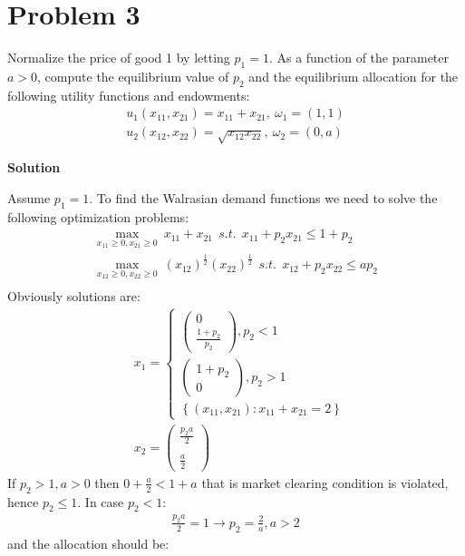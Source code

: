 \documentclass[a4paper]{article}
\begin{document}
\section*{Problem 3}
Normalize the price of good 1 by letting $p_1 = 1$. As a function of the parameter $a > 0$,
compute the equilibrium value of $p_2$ and the equilibrium allocation for the following utility
functions and endowments:
\begin{align*}
u_1(x_{11}, x_{21}) = x_{11} + x_{21},\ \omega_1 = (1, 1)\\
u_2(x_{12}, x_{22}) = \sqrt{x_{12} x_{22}},\ \omega_2 = (0, a)
\end{align*}


\textbf{Solution}


Assume $p_1 = 1$. To find the Walrasian demand functions we need to solve the following optimization problems:
\begin{align*}
\underset{x_{11} \ge 0, x_{21}\ge 0}{\max}\ x_{11} + x_{21}\ \ s.t.\ \ x_{11} + p_2x_{21} \le 1 + p_2\\
\underset{x_{12} \ge 0, x_{22} \ge 0}{\max}\ (x_{12})^{\frac{1}{2}}(x_{22})^{\frac{1}{2}}\ \ s.t.\ \ x_{12} + p_2x_{22} \le ap_2\\
\end{align*}
Obviously solutions are:
\begin{align*}
&x_1 = \begin{cases}
\begin{pmatrix}
0\\
\frac{1+p_2}{p_2}
\end{pmatrix}, p_2 < 1\\
\begin{pmatrix}
1+p_2\\
0
\end{pmatrix}, p_2 > 1\\
\left\{(x_{11}, x_{21}):x_{11} + x_{21} = 2 \right\}
\end{cases}\\
&x_2 = \begin{pmatrix}
\frac{p_2a}{2}\\
\\
\frac{a}{2}
\end{pmatrix}
\end{align*}
If $p_2 > 1, a > 0$ then $0 + \frac{a}{2} < 1 + a$ that is market clearing condition is violated, hence $p_2 \le 1$. In case $p_2 < 1$:
\begin{align*}
\frac{p_2a}{2} = 1 \to p_2 = \frac{2}{a}, a > 2
\end{align*}
and the allocation should be:
\end{document}

